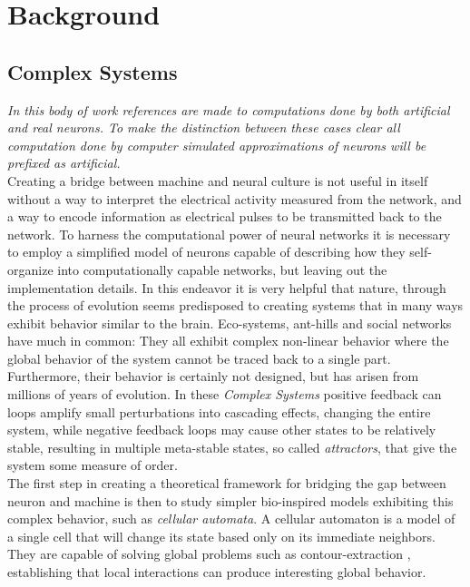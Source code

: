 \chapter{Background}
\section{Complex Systems}
\emph{
  In this body of work references are made to computations done
  by both artificial and real neurons. To make the distinction
  between these cases clear all computation done by computer
  simulated approximations of neurons will be prefixed as
  artificial.
}\\
Creating a bridge between machine and neural culture is not
useful in itself without a way to interpret the electrical activity measured
from the network, and a way to encode information as electrical pulses to be
transmitted back to the network. To harness the computational power of neural
networks it is necessary to employ a simplified model of neurons capable of
describing how they self-organize into computationally capable networks, but
leaving out the implementation details.
In this endeavor it is very helpful that nature, through the process of
evolution seems predisposed to creating systems that in many ways exhibit
behavior similar to the brain.
Eco-systems, ant-hills and social networks have much in common: They all exhibit
complex non-linear behavior where the global behavior of the system cannot be
traced back to a single part.
Furthermore, their behavior is certainly not designed, but has arisen from
millions of years of evolution.
In these \emph{Complex Systems} positive feedback can loops amplify small
perturbations into cascading effects, changing the entire system, while negative
feedback loops may cause other states to be relatively stable, resulting in
multiple meta-stable states, so called \emph{attractors}, that give the system some
measure of order.\\
The first step in creating a theoretical framework for bridging the gap between
neuron and machine is then to study simpler bio-inspired models exhibiting this
complex behavior, such as \emph{cellular automata}.
A cellular automaton is a model of a single cell that will change its state based only on
its immediate neighbors. They are capable of solving global problems such
as contour-extraction \cite{sipper_emergence_1999}, establishing that local interactions can
produce interesting global behavior.\\
